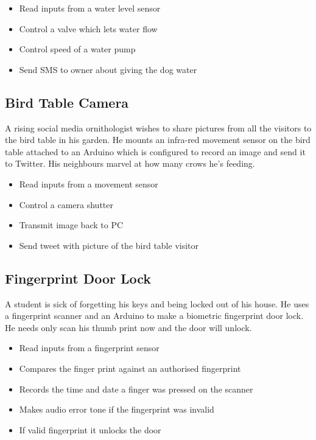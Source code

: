 \begin{itemize}
	\item Read inputs from a water level sensor
	\item Control a valve which lets water flow
	\item Control speed of a water pump 
	\item Send SMS to owner about giving the dog water
\end{itemize}


\subsection*{Bird Table Camera}
A rising social media ornithologist wishes to share pictures from all the visitors to the bird table in his garden. He mounts an infra-red movement sensor on the bird table attached to an \gls{Arduino} which is configured to record an image and send it to Twitter. His neighbours marvel at how many crows he's feeding.

\begin{itemize}
	\item Read inputs from a movement sensor
	\item Control a camera shutter
	\item Transmit image back to PC
	\item Send tweet with picture of the bird table visitor
\end{itemize}


\subsection*{Fingerprint Door Lock}
A student is sick of forgetting his keys and being locked out of his house. He uses a fingerprint scanner and an Arduino to make a biometric fingerprint door lock. He needs only scan his thumb print now and the door will unlock.

\begin{itemize}
	\item Read inputs from a fingerprint sensor
	\item Compares the finger print against an authorised fingerprint
	\item Records the time and date a finger was pressed on the scanner
	\item Makes audio error tone if the fingerprint was invalid
	\item If valid fingerprint it unlocks the door
\end{itemize}


